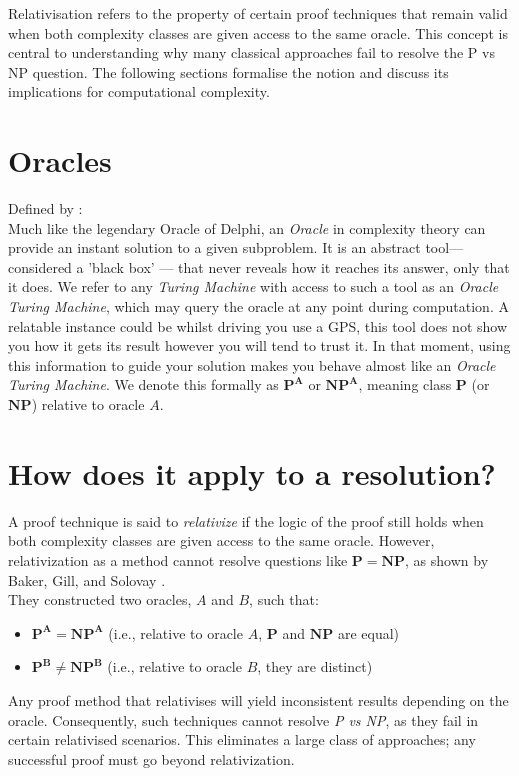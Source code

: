 \documentclass[12pt]{report}
\begin{document}
Relativisation refers to the property of certain proof techniques that remain valid when both complexity classes are given access to the same oracle. This concept is central to understanding why many classical approaches fail to resolve the P vs NP question. The following sections formalise the notion and discuss its implications for computational complexity.

\section{Oracles}
Defined by \cite{arora2009}:\\
Much like the legendary Oracle of Delphi, an \textit{Oracle} in complexity theory can provide an instant solution to a given subproblem.
It is an abstract tool—considered a 'black box' --- that never reveals how it reaches its answer, only that it does.
We refer to any \textit{Turing Machine} with access to such a tool as an \textit{Oracle Turing Machine}, which may query the oracle at any point during computation.
A relatable instance could be whilst driving you use a GPS, this tool does not show you how it gets its result however you will tend to trust it.
In that moment, using this information to guide your solution makes you behave almost like an \textit{Oracle Turing Machine}.
We denote this formally as $\mathbf{P^A}$ or $\mathbf{NP^A}$, meaning class $\mathbf{P}$ (or $\mathbf{NP}$) relative to oracle $A$.

\section{How does it apply to a resolution?}
A proof technique is said to \textit{relativize} if the logic of the proof still holds when both complexity classes are given access to the same oracle.
However, relativization as a method cannot resolve questions like $\mathbf{P = NP}$, as shown by Baker, Gill, and Solovay \cite{baker1975relativizations}.\\
They constructed two oracles, $A$ and $B$, such that:
\begin{itemize}
    \item $\mathbf{P^A = NP^A}$ (i.e., relative to oracle $A$, $\mathbf{P}$ and $\mathbf{NP}$ are equal)
    \item $\mathbf{P^B \neq NP^B}$ (i.e., relative to oracle $B$, they are distinct)
\end{itemize}
Any proof method that relativises will yield inconsistent results depending on the oracle. Consequently, such techniques cannot resolve \textit{P vs NP}, as they fail in certain relativised scenarios. This eliminates a large class of approaches; any successful proof must go beyond relativization.
\end{document}
